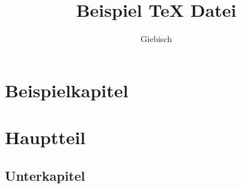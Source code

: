 \documentclass{uni}
\title{Beispiel TeX Datei}
\author{Giebisch}
\begin{document}
    \Title
    \begin{abstract}
        \lipsum[1]
    \end{abstract}
    \newpage
    \tableofcontents
    \newpage

    \section{Beispielkapitel}
    \lipsum[1-3]
    \section{Hauptteil}
    \lipsum[1]
    \subsection{Unterkapitel}
    \lipsum[1]
\end{document}
